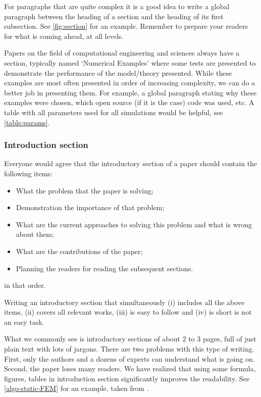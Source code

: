\documentclass[authoryear,3p,times,preprint,review,fleqn]{elsarticle}
\numberwithin{equation}{section}
\theoremstyle{remark}
\begin{document}
For paragraphs that are quite complex it is a good idea to write a global paragraph between the heading of a section and the heading of its first subsection. See \cref{fig:section} for an example. Remember to prepare your readers for what is coming ahead, at all levels. 


Papers on the field of computational engineering and sciences always have a section, typically named `Numerical Examples' where some tests are presented to demonstrate the performance of the model/theory presented. While these examples are most often presented in order of increasing complexity, we can do a better job in presenting them. For example, a global paragraph stating why these examples were chosen, which open source (if it is the case) code was used, etc. A table with all parameters used for all simulations would be helpful, see  \cref{table:params}.

\subsubsection{Introduction section}\label{sec:introduction-part}

Everyone would agree that the introductory section of a paper should contain the following items:

\begin{itemize}
\item What the problem that the paper is solving;
\item Demonstration the importance of that problem;
\item What are the current approaches to solving this problem and what is wrong about them;
\item What are the contributions of the paper; 
\item Planning  the readers for reading the subsequent sections.
\end{itemize}
in that order.

Writing an introductory section that simultaneously (i) includes all the above items, (ii) covers all relevant works, (iii) is easy to follow and (iv) is short is not an easy task.

What we commonly see is introductory sections of about 2 to 3 pages, full of just plain text with lots of jargons. There are two problems with this type of writing. First, only the authors and a dozens of experts can understand what is going on. Second, the paper loses many readers. We have realized that using some formula, figures, tables in introduction section significantly improves the readability.
See \cref{algo-static-FEM} for an example, taken from \cite{Mandal:EFM2019}.
\end{document}
